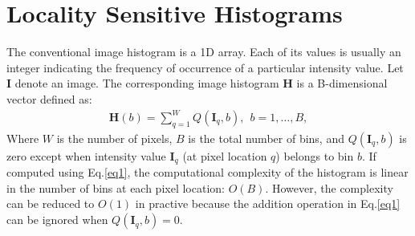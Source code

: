 \documentclass[10pt,twocolumn,letterpaper]{article}
\begin{document}
\section{ Locality Sensitive Histograms}

The conventional image histogram is a 1D array. Each of its values is usually an integer indicating the frequency of occurrence of a particular intensity value. Let $\mathbf{I}$ denote an image. The corresponding image histogram $\mathbf{H}$ is a B-dimensional vector defined as: \\
\begin{gather}
\mathbf{H}(b) = \sum_{q=1}^WQ(\mathbf{I}_q,b),~~b = 1,\dots,B,
\label{eq1}
\end{gather}
Where $W$ is the number of pixels, $B$ is the total number of bins, and $Q(\mathbf{I}_q,b)$ is zero except when intensity value $\mathbf{I}_q$ (at pixel location $q$) belongs to bin $b$. If computed using Eq.\ref{eq1}, the computational complexity of the histogram is linear in the number of bins at each pixel location: $O(B)$. However, the complexity can be reduced to $O(1)$ in practive because the addition operation in Eq.\ref{eq1} can be ignored when $Q(\mathbf{I}_q,b) = 0$.
\end{document}
